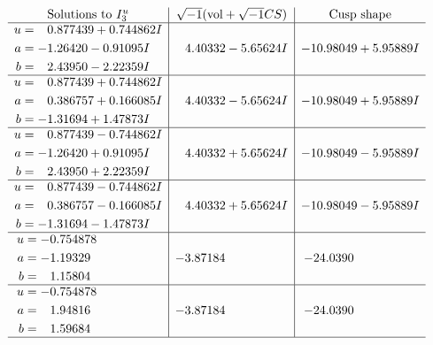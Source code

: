 \documentclass[1p]{elsarticle_modified}
\theoremstyle{definition}
\newcommand{\I}{\sqrt{-1}}
\begin{document}
$$\begin{array}{c|c|c}  
\text{Solutions to }I^u_{3}& \I (\text{vol} + \sqrt{-1}CS) & \text{Cusp shape}\\
 \hline 
\begin{aligned}
u &= \phantom{-}0.877439 + 0.744862 I \\
a &= -1.26420 - 0.91095 I \\
b &= \phantom{-}2.43950 - 2.22359 I\end{aligned}
 & \phantom{-}4.40332 - 5.65624 I & -10.98049 + 5.95889 I \\ \hline\begin{aligned}
u &= \phantom{-}0.877439 + 0.744862 I \\
a &= \phantom{-}0.386757 + 0.166085 I \\
b &= -1.31694 + 1.47873 I\end{aligned}
 & \phantom{-}4.40332 - 5.65624 I & -10.98049 + 5.95889 I \\ \hline\begin{aligned}
u &= \phantom{-}0.877439 - 0.744862 I \\
a &= -1.26420 + 0.91095 I \\
b &= \phantom{-}2.43950 + 2.22359 I\end{aligned}
 & \phantom{-}4.40332 + 5.65624 I & -10.98049 - 5.95889 I \\ \hline\begin{aligned}
u &= \phantom{-}0.877439 - 0.744862 I \\
a &= \phantom{-}0.386757 - 0.166085 I \\
b &= -1.31694 - 1.47873 I\end{aligned}
 & \phantom{-}4.40332 + 5.65624 I & -10.98049 - 5.95889 I \\ \hline\begin{aligned}
u &= -0.754878\phantom{ +0.000000I} \\
a &= -1.19329\phantom{ +0.000000I} \\
b &= \phantom{-}1.15804\phantom{ +0.000000I}\end{aligned}
 & -3.87184\phantom{ +0.000000I} & -24.0390\phantom{ +0.000000I} \\ \hline\begin{aligned}
u &= -0.754878\phantom{ +0.000000I} \\
a &= \phantom{-}1.94816\phantom{ +0.000000I} \\
b &= \phantom{-}1.59684\phantom{ +0.000000I}\end{aligned}
 & -3.87184\phantom{ +0.000000I} & -24.0390\phantom{ +0.000000I}\\
 \hline 
 \end{array}$$\newpage\newpage\renewcommand{\arraystretch}{1}
\end{document}
